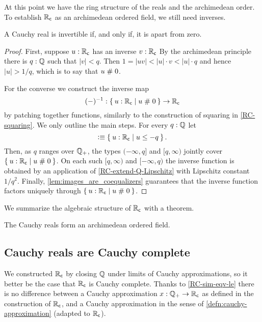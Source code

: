 At this point we have the ring structure of the reals and the archimedean order. To
establish $\mathbb{R}_\mathsf{c}$ as an archimedean ordered field, we still need inverses.

\begin{thm}
  A Cauchy real is invertible if, and only if, it is apart from zero.
\end{thm}

\begin{proof}
  First, suppose $u : \mathbb{R}_\mathsf{c}$ has an inverse $v : \mathbb{R}_\mathsf{c}$ By the archimedean principle there is $q :
  \mathbb{Q}$ such that $|v| < q$. Then $1 = |u v| < |u| \cdot v < |u| \cdot q$ and hence $|u| >
  1/q$, which is to say that $u \mathrel{\#} 0$.

  For the converse we construct the inverse map
  \begin{equation*}
    ({-})^{-1} : \setof{ u : \RC | u \apart 0 } \to \RC
  \end{equation*}
  by patching together functions, similarly to the construction of squaring in
  \autoref{RC-squaring}. We only outline the main steps. For every $q : \mathbb{Q}$ let
  \begin{equation*}
    [q, \infty) \defeq \setof{u : \RC | q \leq u}
    \qquad\text{and}\qquad
    (-\infty, q] \defeq \setof{u : \RC | u \leq -q}.
  \end{equation*}
  Then, as $q$ ranges over $\mathbb{Q}_{+}$, the types $(-\infty, q]$ and $[q, \infty)$ jointly cover
  $\setof{u : \RC | u \apart 0}$. On each such $[q, \infty)$ and $[-\infty, q)$ the
  inverse function is obtained by an application of \autoref{RC-extend-Q-Lipschitz}
  with Lipschitz constant $1/q^2$. Finally, \autoref{lem:images_are_coequalizers}
  guarantees that the inverse function factors uniquely through $\setof{ u : \RC | u
    \apart 0 }$.
\end{proof}

We summarize the algebraic structure of $\mathbb{R}_\mathsf{c}$ with a theorem.

\begin{thm} \label{RC-archimedean-ordered-field}
  The Cauchy reals form an archimedean ordered field.
\end{thm}

\subsection{Cauchy reals are Cauchy complete}
\label{sec:cauchy-reals-cauchy-complete}

We constructed $\mathbb{R}_\mathsf{c}$ by closing $\mathbb{Q}$ under limits of Cauchy approximations, so it better
be the case that $\mathbb{R}_\mathsf{c}$ is Cauchy complete. Thanks to \autoref{RC-sim-eqv-le} there is no
difference between a Cauchy approximation $x : \mathbb{Q}_{+} \to \mathbb{R}_\mathsf{c}$ as defined in the construction
of $\mathbb{R}_\mathsf{c}$, and a Cauchy approximation in the sense of \autoref{defn:cauchy-approximation}
(adapted to $\mathbb{R}_\mathsf{c}$).

